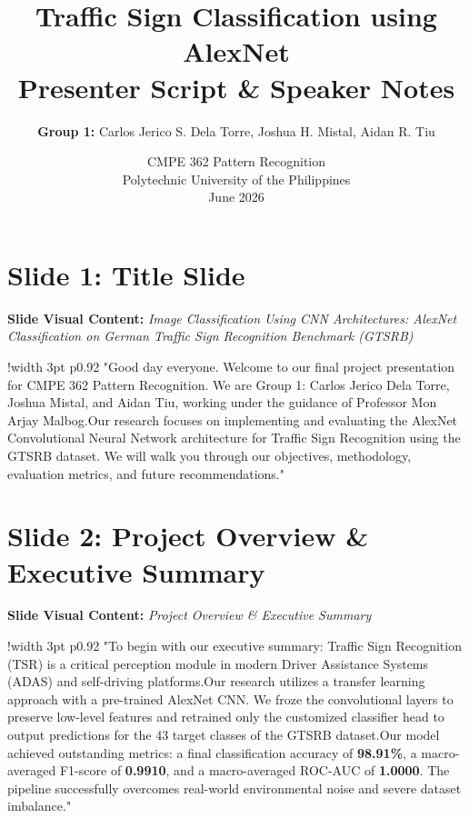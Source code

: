 \documentclass[11pt]{article}
\title{\bfseries Traffic Sign Classification using AlexNet \\ Presenter Script \& Speaker Notes}
\author{\textbf{Group 1:} Carlos Jerico S. Dela Torre, Joshua H. Mistal, Aidan R. Tiu}
\date{CMPE 362 Pattern Recognition \\ Polytechnic University of the Philippines \\ June 2026}
\begin{document}
\maketitle
\tableofcontents
\clearpage
\section{Slide 1: Title Slide}
\textbf{Slide Visual Content:} \textit{Image Classification Using CNN Architectures: AlexNet Classification on German Traffic Sign Recognition Benchmark (GTSRB)}\\ [8pt]
\noindent
\begin{tabular}{!{\color{primary}\vrule width 3pt} p{0.92\textwidth}}
  \small\color{black!80} "Good day everyone. Welcome to our final project presentation for CMPE 362 Pattern Recognition. We are Group 1: Carlos Jerico Dela Torre, Joshua Mistal, and Aidan Tiu, working under the guidance of Professor Mon Arjay Malbog.\newline\newline Our research focuses on implementing and evaluating the AlexNet Convolutional Neural Network architecture for Traffic Sign Recognition using the GTSRB dataset. We will walk you through our objectives, methodology, evaluation metrics, and future recommendations."
\end{tabular}
\vspace{15pt}

\section{Slide 2: Project Overview \& Executive Summary}
\textbf{Slide Visual Content:} \textit{Project Overview \& Executive Summary}\\ [8pt]
\noindent
\begin{tabular}{!{\color{primary}\vrule width 3pt} p{0.92\textwidth}}
  \small\color{black!80} "To begin with our executive summary: Traffic Sign Recognition (TSR) is a critical perception module in modern Driver Assistance Systems (ADAS) and self-driving platforms.\newline\newline Our research utilizes a transfer learning approach with a pre-trained AlexNet CNN. We froze the convolutional layers to preserve low-level features and retrained only the customized classifier head to output predictions for the 43 target classes of the GTSRB dataset.\newline\newline Our model achieved outstanding metrics: a final classification accuracy of \textbf{98.91\%}, a macro-averaged F1-score of \textbf{0.9910}, and a macro-averaged ROC-AUC of \textbf{1.0000}. The pipeline successfully overcomes real-world environmental noise and severe dataset imbalance."
\end{tabular}
\vspace{15pt}
\end{document}
